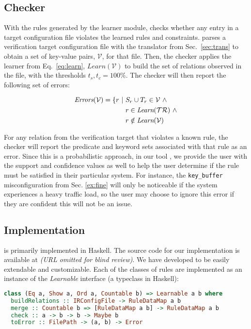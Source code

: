 \subsection{Checker}
\label{sec-checker}

With the rules generated by the learner module, \app checks whether any entry in a target configuration file violates the learned rules and constraints.
\app parses a verification target configuration file with the translator from Sec.~\ref{sec:trans}  to obtain a set of key-value pairs, $\mathcal{V}$, for that file.
Then, the checker applies the learner from Eq.~\ref{eq:learn},
$\textit{Learn}(\mathcal{V})$ to build the set of relations observed in the file, with the thresholds $t_s,t_c = 100\%$. 
The checker will then report the following set of errors:

\begin{align*}
\textit{Errors}(\mathcal{V}) = \{ r\ |\ & S_r \cup T_r \in \mathcal{V} \ \land \\
                               & r \in \textit{Learn}(\mathcal{TR}) \ \land \\
                               & r \notin \textit{Learn}(\mathcal{V})
\end{align*}

For any relation from the verification target that violates a known rule, the checker will report the predicate and keyword sets associated with that rule as an error.
Since this is a probabilistic approach, in our tool \app, we provide the user with the support and confidence values as well to help the user determine if the rule must be satisfied in their particular system.
For instance, the \texttt{key\_buffer} misconfiguration from Sec. \ref{ex:fine} will only be noticeable if the system experiences a heavy traffic load, so the user may choose to ignore this error if they are confident this will not be an issue.

\iffalse
\subsection{Implementation}

\app is primarily implemented in Haskell.
The source code for our implementation is available at {\em (URL omitted for blind review)}.
We have developed \app to be easily extendable and customizable. Each of the classes of rules are implemented as an instance of the \textit{Learnable} interface (a typeclass in Haskell):

\begin{lstlisting}[language=Haskell, xleftmargin=.01\textwidth]
class (Eq a, Show a, Ord a, Countable b) => Learnable a b where
  buildRelations :: IRConfigFile -> RuleDataMap a b
  merge :: Countable b => [RuleDataMap a b] -> RuleDataMap a b
  check :: a -> b -> b -> Maybe b
  toError :: FilePath -> (a, b) -> Error
\end{lstlisting} 

